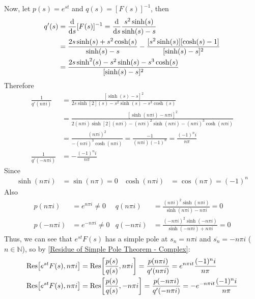 \documentclass[12pt, english]{book}
\makeatletter
\renewenvironment{proof}[1][\proofname]{\par
	\pushQED{\qed}%
	\normalfont \topsep6\p@\@plus6\p@\relax
	\list{}{%
		\settowidth{\leftmargin}{\itshape\proofname:\hskip\labelsep}%
		\setlength{\labelwidth}{0pt}%
		\setlength{\itemindent}{-\leftmargin}%
	}%
	\item[\hskip\labelsep\itshape#1\@addpunct{:}]\ignorespaces
	}{ \popQED\endlist\@endpefalse}
\makeatother
\begin{document}
\begin{example}
\begin{proof}
{			Now, let \(p(s) = e^{st}\) and \(q(s) = [F(s)]^{-1}\), then
			\begin{align*}
				q'(s) 
				&= \dv{s} [F(s)]^{-1} = \dv{s} \frac{s^2 \sinh(s)}{\sinh(s) - s} \\
				&= \frac{2s\sinh(s) + s^2 \cosh(s)}{\sinh(s) - s}
					- \frac{[s^2 \sinh(s)][\cosh(s) - 1]}{[\sinh(s) - s]^{2}} \\
				&= \frac{2s\sinh[2](s) - s^2 \sinh(s) - s^3 \cosh(s)}{[\sinh(s) - s]^{2}}
			\end{align*}
			Therefore
			\begin{align*}
				\frac{1}{q'(n\pi i)}
				&= \frac{[\sinh(s) - s]^{2}}{2s\sinh[2](s) - s^2 \sinh(s) - s^3 \cosh(s)} \\
				&= \frac{[\sinh(n\pi i) - n\pi i]^{2}}{2(n\pi i)\sinh[2](n\pi i) - (n\pi i)^2 \sinh(n\pi i) - (n\pi i)^3 \cosh(n\pi i)} \\
				&= \frac{(n\pi i)^2}{-(n\pi i)^3 \cosh(n\pi i)} 
				 = \frac{-1}{(n\pi i)(-1)^n} = \frac{(-1)^{n} i}{n\pi} \\
				\frac{1}{q'(- n\pi i)} 
				&= - \frac{(-1)^{n} i}{n\pi}
			\end{align*}
			Since
			\begin{align*}
				\sinh(n\pi i) &= \sin(n\pi) = 0 	&
				\cosh(n\pi i) &= \cos(n\pi) = (-1)^n
			\end{align*}
			Also
			\begin{align*}
				p(n\pi i)  &= e^{n\pi i} \neq 0 &
				q(n\pi i) 
				&= \frac{(n\pi i)^2 \sinh(n\pi i)}{\sinh(n\pi i) - n\pi i} = 0 \\
				p(-n\pi i) &= e^{-n\pi i} \neq 0 &
				q(-n\pi i) 
				&= \frac{(-n\pi i)^2 \sinh(-n\pi i)}{\sinh(-n\pi i) + n\pi i} = 0 
			\end{align*}
			Thus, we can see that \(e^{st} F(s)\) has a simple pole at \(s_n = n\pi i\) and \(\overline{s_n} = -n\pi i\) (\(n\in \mathbb{N}\)), so by \cref{Residue of Simple Pole Theorem - Complex}: 
			\begin{align*}
				\Res[e^{st}F(s), n\pi i] 
				&= \Res[\frac{p(s)}{q(s)}, n\pi i] 
				 = \frac{p(n\pi i)}{q'(n\pi i)} 
				 = e^{n\pi i t} \frac{(-1)^{n} i}{n\pi}  \\
				\Res[e^{st}F(s), n\pi i] 
				&= \Res[\frac{p(s)}{q(s)}, -n\pi i] 
				 = \frac{p(-n\pi i)}{q'(-n\pi i)} 
				 = - e^{-n\pi i t} \frac{(-1)^{n} i}{n\pi}

\end{align*}}
\end{proof}
\end{example}
\end{document}
